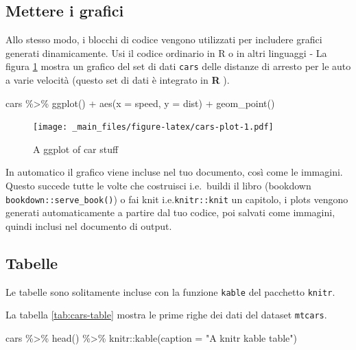 \documentclass[a4paper, 11pt, nobind]{templates/ociamthesis}
\newenvironment{Shaded}{\begin{snugshade}}{\end{snugshade}}
\newcommand{\AttributeTok}[1]{\textcolor[rgb]{0.77,0.63,0.00}{#1}}
\newcommand{\FunctionTok}[1]{\textcolor[rgb]{0.00,0.00,0.00}{#1}}
\newcommand{\NormalTok}[1]{#1}
\newcommand{\SpecialCharTok}[1]{\textcolor[rgb]{0.00,0.00,0.00}{#1}}
\newcommand{\StringTok}[1]{\textcolor[rgb]{0.31,0.60,0.02}{#1}}
\renewenvironment{Shaded}
{
  \vspace{10pt}%
  \begin{snugshade}%
}{%
  \end{snugshade}%
  \vspace{8pt}%
}
\begin{document}
\hypertarget{mettere-i-grafici}{%
\subsection{Mettere i grafici}\label{mettere-i-grafici}}

Allo stesso modo, i blocchi di codice vengono utilizzati per includere grafici generati dinamicamente.
Usi il codice ordinario in R o in altri linguaggi - La figura \ref{fig:cars-plot} mostra un grafico del set di dati \texttt{cars} delle distanze di arresto per le auto a varie velocità (questo set di dati è integrato in \textbf{R} ).

\begin{Shaded}
\begin{Highlighting}[]
\NormalTok{cars }\SpecialCharTok{\%\textgreater{}\%} 
  \FunctionTok{ggplot}\NormalTok{() }\SpecialCharTok{+}
    \FunctionTok{aes}\NormalTok{(}\AttributeTok{x =}\NormalTok{ speed, }\AttributeTok{y =}\NormalTok{ dist) }\SpecialCharTok{+}
    \FunctionTok{geom\_point}\NormalTok{()}
\end{Highlighting}
\end{Shaded}

\begin{figure}
\centering
\texttt{[image: \_main\_files/figure-latex/cars-plot-1.pdf]}
\caption{\label{fig:cars-plot}A ggplot of car stuff}
\end{figure}

In automatico il grafico viene incluse nel tuo documento, così come le immagini. Questo succede tutte le volte che costruisci i.e.~buildi il libro (bookdown \texttt{bookdown::serve\_book()}) o fai knit i.e.\texttt{knitr::knit} un capitolo, i plots vengono generati automaticamente a partire dal tuo codice, poi salvati come immagini, quindi inclusi nel documento di output.

\hypertarget{tabelle}{%
\subsection{Tabelle}\label{tabelle}}

Le tabelle sono solitamente incluse con la funzione \texttt{kable} del pacchetto \texttt{knitr}.

La tabella \ref{tab:cars-table} mostra le prime righe dei dati del dataset \texttt{mtcars}.

\begin{Shaded}
\begin{Highlighting}[]
\NormalTok{cars }\SpecialCharTok{\%\textgreater{}\%} 
  \FunctionTok{head}\NormalTok{() }\SpecialCharTok{\%\textgreater{}\%} 
\NormalTok{  knitr}\SpecialCharTok{::}\FunctionTok{kable}\NormalTok{(}\AttributeTok{caption =} \StringTok{"A knitr kable table"}\NormalTok{)}
\end{Highlighting}
\end{Shaded}
\end{document}
